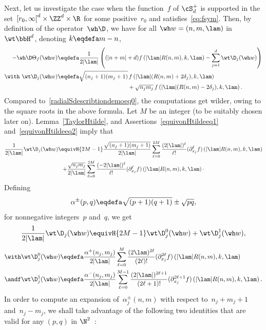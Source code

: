 Next, let us investigate the case when the function~$f$ of $\cS_d^+$ is supported in the set~$[r_0,\infty\mathclose{[}^d\times \ZZ^d\times \R$ for some positive~$r_0$ and satisfies~\eqref{eq:fsym}. Then, by definition of the operator~$\wh \D$, we have for all $\wh w=(n,m,\lam)$ in~$\wt\bbH^d$, denoting $k\eqdefa m-n$,
\begin{align*}
-\wh \D \Theta_f (\wh w) &\eqdefa \frac {1} {2 |\lam|} \left((|n+m| +d) f\left (|\lam|R(n,m),k,\lam\right) -\sum_{j=1}^d \wt \D_j (\wh w)\right)\\ \with \
\wt \D_j (\wh w) & \eqdefa \sqrt{(n_j+1)(m_j+1)} \, f \left(|\lam|(R(n,m)+2\delta_j),k, \lam\right) \\
&\qquad\qquad\qquad\qquad\qquad\qquad{} + \sqrt {n_jm_j} \, f \left(|\lam|(R(n,m)-2\delta_j),k,\lam\right).
\end{align*}
Compared to~\eqref{radialSdescribtiondemoeq0}, the computations get wilder, owing to the square roots in the above formula. Let $M$ be an integer (to be suitably chosen later on). Lemma~\ref{TaylorHtilde}, and Assertions~\eqref{equivonHtildeeq1} and~\eqref{equivonHtildeeq2} imply that
\begin{multline*}
\frac 1 {2|\lam|} \wt \D_j (\wh w) \equivH {2M-1} \frac {\sqrt{(n_j+1)(m_j+1)}} {2|\lam|}
\sum_{\ell=0} ^{2M} \frac {(2|\lam|)^\ell } {\ell!} (\partial_{x_j}^\ell f)\left(|\lam|R(n,m),k,\lam\right)\\  +\frac {\sqrt{n_jm_j}} {2|\lam|} \sum_{\ell=0} ^{2M} \frac { (-2|\lam|)^\ell } {\ell!} (\partial_{x_j}^\ell f)\left(|\lam|R(n,m),k,\lam\right)\cdotp
\end{multline*}
Defining
\[
\alpha^\pm(p,q) \eqdefa \sqrt{(p+1)(q+1)}\pm\sqrt {pq},
\]
for nonnegative integers~$p$ and~$q$, we get
\[
\frac 1 {2|\lam|} \wt \D_j (\wh w) \equivH {2M-1} \wt \D_j^{0} (\wh w) +\wt \D_j^{1} (\wh w),
\]
\[
\begin{aligned}
\with\wt \D_j^{0} (\wh w) & \eqdefa \frac {\alpha^+(n_j,m_j) } {2|\lam|} \sum_{\ell=0} ^{M} \frac {(2\lam)^{2\ell}} {(2\ell)!} (\partial_{x_j}^{2\ell} f)\left(|\lam|R(n,m),k,\lam\right)\\
\andf\wt \D_j^{1} (\wh w) & \eqdefa \frac {\alpha^-(n_j,m_j) } {2|\lam|}
\sum_{\ell=0} ^{M-1} \frac {(2|\lam|)^{2\ell+1} } {(2\ell+1)!} (\partial_{x_j}^{2\ell+1} f)\left(|\lam|R(n,m),k,\lam\right).
\end{aligned}
\]
In order to compute an expansion of~$\alpha_j^\pm(n,m)$ with respect to~$n_j+m_j+1$ and~$n_j-m_j$, we shall take advantage of the following two identities that are valid for any $(p,q)$ in $\N^2$~:
